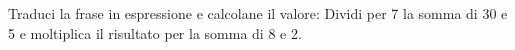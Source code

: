 \item Traduci la frase in espressione e calcolane il valore: Dividi per 7 la somma di 30 e 5 e moltiplica il risultato per la somma di 8 e 2.